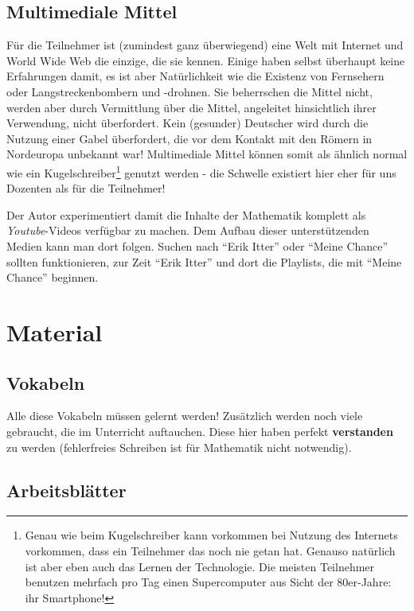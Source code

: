 \documentclass[a4paper]{book}%
\theoremstyle{definition}
\begin{document}
\chapter{Multimediale Mittel}

Für die Teilnehmer ist (zumindest ganz überwiegend) eine Welt mit Internet und World Wide Web die einzige, die sie kennen. Einige haben selbst überhaupt keine Erfahrungen damit, es ist aber Natürlichkeit wie die Existenz von Fernsehern oder Langstreckenbombern und -drohnen. Sie beherrschen die Mittel nicht, werden aber durch Vermittlung über die Mittel, angeleitet hinsichtlich ihrer Verwendung, nicht überfordert. Kein (gesunder) Deutscher wird durch die Nutzung einer Gabel überfordert, die vor dem Kontakt mit den Römern in Nordeuropa unbekannt war! Multimediale Mittel können somit als ähnlich normal wie ein Kugelschreiber\footnote{Genau wie beim Kugelschreiber kann vorkommen bei Nutzung des Internets vorkommen, dass ein Teilnehmer das noch nie getan hat. Genauso natürlich ist aber eben auch das Lernen der Technologie. Die meisten Teilnehmer benutzen mehrfach pro Tag einen Supercomputer aus Sicht der 80er-Jahre: ihr Smartphone!} genutzt werden - die Schwelle existiert hier eher für uns Dozenten als für die Teilnehmer!

Der Autor experimentiert damit die Inhalte der Mathematik komplett als \textit{Youtube}-Videos verfügbar zu machen. Dem Aufbau dieser unterstützenden Medien kann man dort folgen. Suchen nach \enquote{Erik Itter} oder \enquote{Meine Chance} sollten funktionieren, zur Zeit \enquote{Erik Itter} und dort die Playlists, die mit \enquote{Meine Chance} beginnen.

\part{Material}

\chapter{Vokabeln}

Alle diese Vokabeln müssen gelernt werden! Zusätzlich werden noch viele gebraucht, die im Unterricht auftauchen. Diese hier haben perfekt \textbf{verstanden} zu werden (fehlerfreies Schreiben ist für Mathematik nicht notwendig).



\chapter{Arbeitsblätter}
\end{document}
